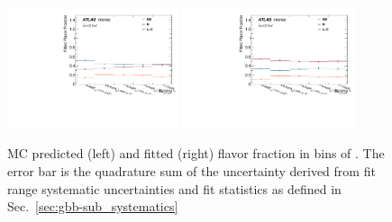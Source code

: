 \begin{figure}[htbp]
  \centering
 \includegraphics[width=0.45\textwidth]{figures/gbb/Sub_Sd0_Fits/Canv_fracmasspt_FitFrac_Original.pdf}
 \includegraphics[width=0.45\textwidth]{figures/gbb/Sub_Sd0_Fits/Canv_fracmasspt_FitFrac_Corrected.pdf}

\caption{MC predicted (left) and fitted (right) flavor fraction in bins of \mpt. The error bar is the quadrature sum of the uncertainty derived from fit range systematic uncertainties and fit statistics as defined in Sec.~\ref{sec:gbb-sub_systematics}}
  \label{fig:fracmasspt-fitfrac}
\end{figure}


